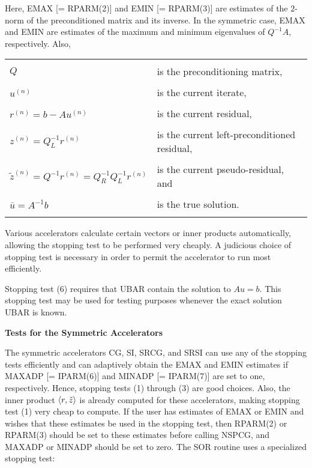 \bigskip
Here, EMAX [= RPARM(2)] and EMIN [= RPARM(3)] are estimates of 
the $2$-norm of the preconditioned matrix and its inverse.  In the 
symmetric case, EMAX and EMIN are estimates of the maximum and 
minimum eigenvalues of $Q^{-1}A$, respectively.  Also,
\bigskip
 
\begin{tabular}{ll}
                & \\
      $Q$       & is the preconditioning matrix, \\
                & \\
      $u^{(n)}$ & is the current iterate, \\
                & \\
      $r^{(n)}=b-Au^{(n)}$ & is the current residual, \\
          & \\
      $z^{(n)}=Q_L^{-1}r^{(n)}$ & is the current
                               left-preconditioned residual, \\
          & \\
      $\tilde z^{(n)}=Q^{-1}r^{(n)}=Q_R^{-1}Q_L^{-1}r^{(n)}$ & is the current
                               pseudo-residual, and \\
          & \\
      $\bar{u}=A^{-1}b$ & is the true solution. \\
          &
\end{tabular}
 
\bigskip

    Various accelerators calculate certain vectors or inner products
automatically, allowing the stopping test to be performed very
cheaply.  A judicious choice of stopping test is necessary in order
to permit the accelerator to run most efficiently.

    Stopping test (6) requires that UBAR contain the solution to
$Au=b$.  This stopping test may be used for testing purposes whenever 
the exact solution UBAR is known.

\bigskip
\noindent
{\bf Tests for the Symmetric Accelerators}
\bigskip
\indent
 
    The symmetric accelerators CG, SI, SRCG, and SRSI can use any of
the stopping tests efficiently and can adaptively obtain the
EMAX and EMIN estimates if MAXADP [= IPARM(6)] and MINADP [= IPARM(7)]
are set to one, respectively.  Hence, stopping tests (1) through (3) 
are good choices.  Also, the inner product $\langle r,\tilde{z} \rangle$ 
is already computed for these accelerators, making stopping test 
(1) very cheap to compute.  If the user has estimates of EMAX or
EMIN and wishes that these estimates be used in the stopping test,
then RPARM(2) or RPARM(3) should be set to these estimates 
before calling NSPCG, and MAXADP or MINADP should be set to zero.
The SOR routine uses a specialized stopping test:
 
